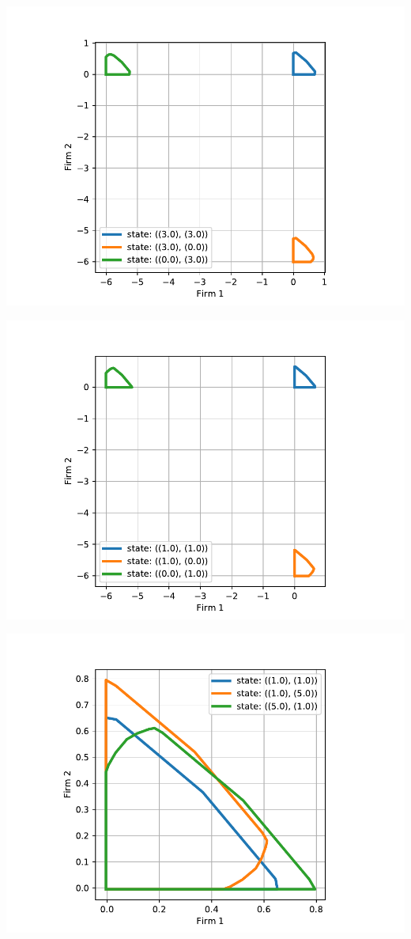 \documentclass[11pt]{article}
\begin{document}
\includegraphics[width=.9\linewidth]{./img/overlap_21_18_3.pdf}

\includegraphics[width=.9\linewidth]{./img/overlap_7_6_1.pdf}

\includegraphics[width=.9\linewidth]{./img/overlap_7_11_31.pdf}
\end{document}
